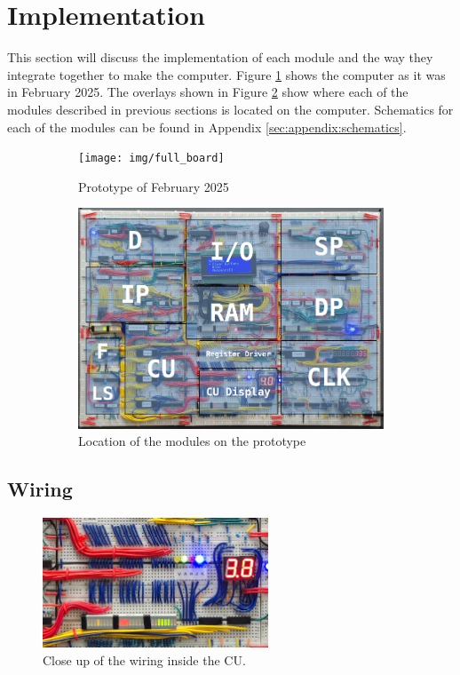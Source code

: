 \section{Implementation} \label{sec:implementation}
This section will discuss the implementation of each module and the way they integrate together to make the computer. Figure \ref{fig:prototypea} shows the computer as it was in February 2025. The overlays shown in Figure \ref{fig:prototypeb} show where each of the modules described in previous sections is located on the computer. Schematics for each of the modules can be found in Appendix \ref{sec:appendix:schematics}.

\begin{figure}[H]
  \centering
  \begin{subfigure}{0.9\linewidth}
    \centering
    \texttt{[image: img/full\_board]}
    \caption{Prototype of February 2025}
    \label{fig:prototypea}
  \end{subfigure}
  \vspace{\baselineskip}
  \begin{subfigure}{0.9\linewidth}
    \centering
    \includegraphics[width=0.8\linewidth]{img/computerparts}
    \caption{Location of the modules on the prototype}
    \label{fig:prototypeb}
  \end{subfigure}
  \caption{}
  \label{fig:prototype}
\end{figure}


\newpage\subsection{Wiring}
\begin{figure}[H]
  \centering
  \includegraphics[width=0.6\textwidth]{img/wiring}
  \caption{Close up of the wiring inside the CU.}
  \label{fig:wiring}
\end{figure}

